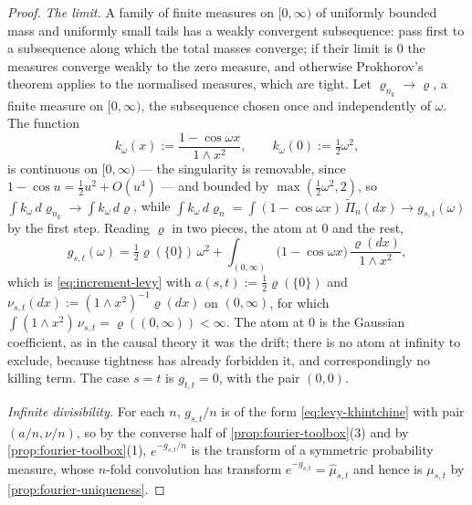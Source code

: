 \begin{proof}
\emph{The limit.} A family of finite measures on $[0,\infty)$ of uniformly bounded mass and
uniformly small tails has a weakly convergent subsequence: pass first to a subsequence along
which the total masses converge; if their limit is $0$ the measures converge weakly to the
zero measure, and otherwise Prokhorov's theorem applies to the normalised measures, which are
tight. Let $\varrho_{n_k} \to \varrho$, a finite measure on $[0,\infty)$, the subsequence
chosen once and independently of $\omega$. The function
\[
  k_\omega(x) := \frac{1 - \cos\omega x}{1 \wedge x^2}, \qquad k_\omega(0) := \tfrac12\omega^2,
\]
is continuous on $[0,\infty)$ --- the singularity is removable, since
$1 - \cos u = \tfrac12u^2 + O(u^4)$ --- and bounded by $\max(\tfrac12\omega^2, 2)$, so
$\int k_\omega\,d\varrho_{n_k} \to \int k_\omega\,d\varrho$, while
$\int k_\omega\,d\varrho_n = \int (1-\cos\omega x)\,\widetilde\Pi_n(dx) \to g_{s,t}(\omega)$ by
the first step. Reading $\varrho$ in two pieces, the atom at $0$ and the rest,
\[
  g_{s,t}(\omega) = \tfrac12\varrho(\{0\})\,\omega^2
   + \int_{(0,\infty)} \bigl(1 - \cos\omega x\bigr)\,\frac{\varrho(dx)}{1 \wedge x^2},
\]
which is \ref{eq:increment-levy} with $a(s,t) := \tfrac12\varrho(\{0\})$ and
$\nu_{s,t}(dx) := (1 \wedge x^2)^{-1}\varrho(dx)$ on $(0,\infty)$, for which
$\int (1 \wedge x^2)\,\nu_{s,t} = \varrho((0,\infty)) < \infty$. The atom at $0$ is the Gaussian
coefficient, as in the causal theory it was the drift; there is no atom at infinity to exclude,
because tightness has already forbidden it, and correspondingly no killing term. The case
$s = t$ is $g_{t,t} = 0$, with the pair $(0,0)$.

\emph{Infinite divisibility.} For each $n$, $g_{s,t}/n$ is of the form
\ref{eq:levy-khintchine} with pair $(a/n, \nu/n)$, so by the converse half of
\ref{prop:fourier-toolbox}(3) and by \ref{prop:fourier-toolbox}(1), $e^{-g_{s,t}/n}$ is the
transform of a symmetric probability measure, whose $n$-fold convolution has transform
$e^{-g_{s,t}} = \hat\mu_{s,t}$ and hence is $\mu_{s,t}$ by \ref{prop:fourier-uniqueness}.
\end{proof}

